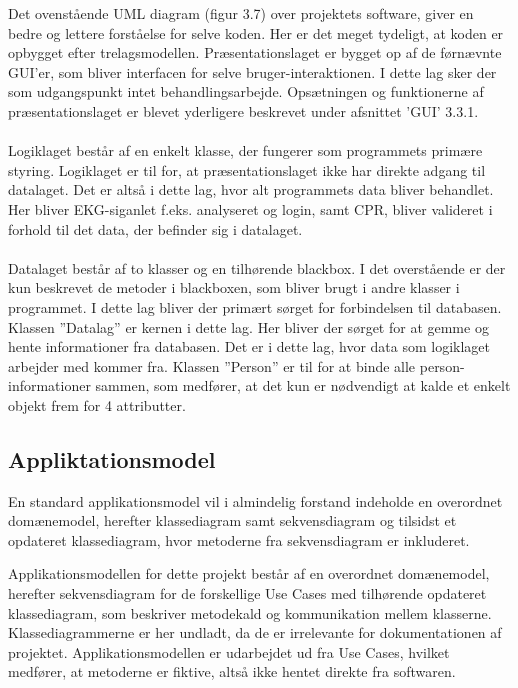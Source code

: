 Det ovenstående UML diagram (figur 3.7) over projektets software, giver en bedre og lettere forståelse for selve koden. Her er det meget tydeligt, at koden er opbygget efter trelagsmodellen. Præsentationslaget er bygget op af de førnævnte GUI’er, som bliver interfacen for selve bruger-interaktionen. I dette lag sker der som udgangspunkt intet behandlingsarbejde. Opsætningen og funktionerne af præsentationslaget er blevet yderligere beskrevet under afsnittet ’GUI’ 3.3.1.\\ \\
Logiklaget består af en enkelt klasse, der fungerer som programmets primære styring. Logiklaget er til for, at præsentationslaget ikke har direkte adgang til datalaget. Det er altså i dette lag, hvor alt programmets data bliver behandlet.  Her bliver EKG-siganlet f.eks. analyseret og login, samt CPR, bliver valideret i forhold til det data, der befinder sig i datalaget. \\ \\
Datalaget består af to klasser og en tilhørende blackbox. I det overstående er der kun beskrevet de metoder i blackboxen, som bliver brugt i andre klasser i programmet. I dette lag bliver der primært sørget for forbindelsen til databasen. Klassen ”Datalag” er kernen i dette lag. Her bliver der sørget for at gemme og hente informationer fra databasen. Det er i dette lag, hvor data som logiklaget arbejder med kommer fra. Klassen ”Person” er til for at binde alle person-informationer sammen, som medfører, at det kun er nødvendigt at kalde et enkelt objekt frem for 4 attributter. 

\subsection{Appliktationsmodel}
En standard applikationsmodel vil i almindelig forstand indeholde en overordnet domænemodel, herefter klassediagram samt sekvensdiagram og tilsidst et opdateret klassediagram, hvor metoderne fra sekvensdiagram er inkluderet. 

Applikationsmodellen for dette projekt består af en overordnet domænemodel, herefter sekvensdiagram for de forskellige Use Cases med tilhørende opdateret klassediagram, som beskriver metodekald og kommunikation mellem klasserne. Klassediagrammerne er her undladt, da de er irrelevante for dokumentationen af projektet. Applikationsmodellen er udarbejdet ud fra Use Cases, hvilket medfører, at metoderne er fiktive, altså ikke hentet direkte fra softwaren.  

